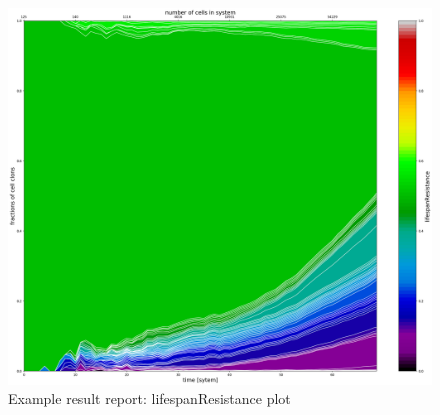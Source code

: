 \begin{figure}[h!]
	\centering
		\includegraphics[width=0.7\linewidth]{reports/lifespanResistance.png}
	\caption{Example result report: lifespanResistance plot}
	\label{fig:result-lifespan}
\end{figure}

\newpage